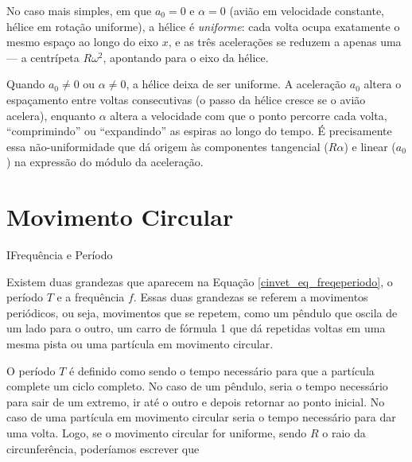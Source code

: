 \begin{exemplo}[Nível II]
No caso mais simples, em que $a_0 = 0$ e $\alpha = 0$ (avião em
velocidade constante, hélice em rotação uniforme), a hélice é
\emph{uniforme}: cada volta ocupa exatamente o mesmo espaço ao longo
do eixo $x$, e as três acelerações se reduzem a apenas uma — a
centrípeta $R\omega^2$, apontando para o eixo da hélice.

Quando $a_0 \neq 0$ ou $\alpha \neq 0$, a hélice deixa de ser
uniforme. A aceleração $a_0$ altera o espaçamento entre voltas
consecutivas (o passo da hélice cresce se o avião acelera), enquanto
$\alpha$ altera a velocidade com que o ponto percorre cada volta,
``comprimindo'' ou ``expandindo'' as espiras ao longo do tempo. É
precisamente essa não-uniformidade que dá origem às componentes
tangencial ($R\alpha$) e linear ($a_0$) na expressão do módulo da
aceleração.


\end{exemplo}

\vspace{0.3cm}















\chapter{Movimento Circular}




\begin{secnivel}{I}{Frequência e Período}
  

\end{secnivel}








Existem duas grandezas que aparecem na Equação \eqref{cinvet_eq_freqeperiodo}, o período $T$ e a frequência $f.$ Essas duas grandezas se referem a movimentos periódicos, ou seja, movimentos que se repetem, como um pêndulo que oscila de um lado para o outro, um carro de fórmula 1 que dá repetidas voltas em uma mesma pista ou uma partícula em movimento circular.

O período $T$ é definido como sendo o tempo necessário para que a partícula complete um ciclo completo. No caso de um pêndulo, seria o tempo necessário para sair de um extremo, ir até o outro e depois retornar ao ponto inicial. No caso de uma partícula em movimento circular seria o tempo necessário para dar uma volta. Logo, se o movimento circular for uniforme, sendo $R$ o raio da circunferência, poderíamos escrever que 

